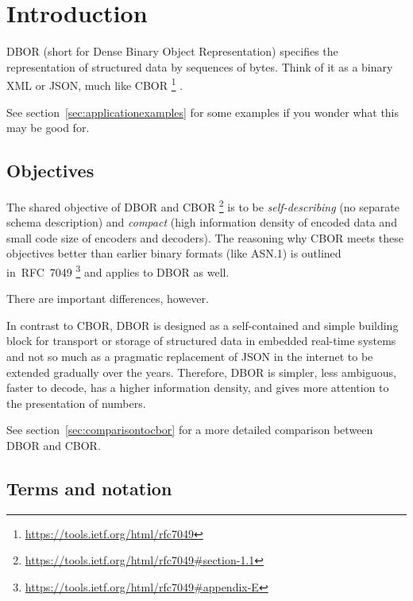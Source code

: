 
\section{Introduction}

DBOR (short for Dense Binary Object Representation) specifies the representation of structured data by
sequences of bytes.
Think of it as a binary XML or JSON, much like CBOR%
\footnote{%
    \url{https://tools.ietf.org/html/rfc7049}
}%
.

\medskip
See section~\ref{sec:applicationexamples} for some examples if you wonder what this may be good for.


\subsection{Objectives}

The shared objective of DBOR and CBOR%
\footnote{%
    \url{https://tools.ietf.org/html/rfc7049\#section-1.1}
}
is to be
\emph{self-describing} (no separate schema description) and
\emph{compact} (high information density of encoded data and small code size of encoders and decoders).
The reasoning why CBOR meets these objectives better than earlier binary formats (like ASN.1) is outlined in~RFC~7049%
\footnote{%
    \url{https://tools.ietf.org/html/rfc7049\#appendix-E}
}
and applies to DBOR as well.

\medskip
There are important differences, however.

In contrast to CBOR, DBOR is designed as a self-contained and simple building block for transport or storage
of structured data in embedded real-time systems and not so much as a pragmatic replacement of JSON in the internet
to be extended gradually over the years.
Therefore, DBOR is simpler, less ambiguous, faster to decode, has a higher information density, and gives more attention
to the presentation of numbers.

\medskip
See section~\ref{sec:comparisontocbor} for a more detailed comparison between DBOR and CBOR\@.


\subsection{Terms and notation}

